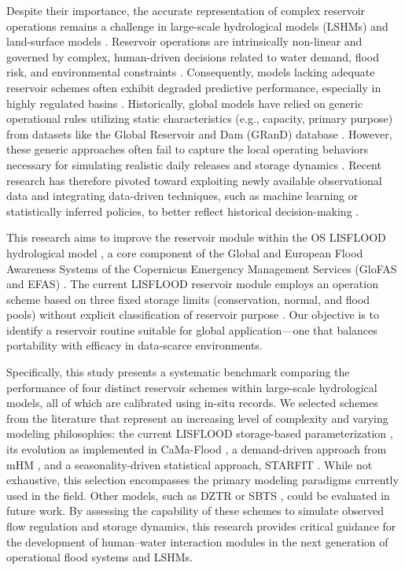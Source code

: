 \documentclass[hess, manuscript]{copernicus}
\begin{document}
Despite their importance, the accurate representation of complex reservoir operations remains a challenge in large-scale hydrological models (LSHMs) and land-surface models \citep{Turner2021, Sadki2023, Salwey2024}. Reservoir operations are intrinsically non-linear and governed by complex, human-driven decisions related to water demand, flood risk, and environmental constraints \citep{Coerver2018, Hanazaki2022, Steyaert2022, Salwey2024, Shrestha2024}. Consequently, models lacking adequate reservoir schemes often exhibit degraded predictive performance, especially in highly regulated basins \citep{Turner2021, Salwey2024, Steyaert2025}. Historically, global models have relied on generic operational rules utilizing static characteristics (e.g., capacity, primary purpose) from datasets like the Global Reservoir and Dam (GRanD) database \citep{Lehner2011}. However, these generic approaches often fail to capture the local operating behaviors necessary for simulating realistic daily releases and storage dynamics \citep{Turner2021}. Recent research has therefore pivoted toward exploiting newly available observational data and integrating data-driven techniques, such as machine learning or statistically inferred policies, to better reflect historical decision-making \citep{Coerver2018, Turner2021, Steyaert2025}.

This research aims to improve the reservoir module within the OS LISFLOOD hydrological model \citep{DeRoo2000, vanderKnijff2010, Burek2013a, JRC2026}, a core component of the Global and European Flood Awareness Systems of the Copernicus Emergency Management Services (GloFAS and EFAS) \citep{EFAS2026, GloFAS2026}. The current LISFLOOD reservoir module employs an operation scheme based on three fixed storage limits (conservation, normal, and flood pools) without explicit classification of reservoir purpose  \citep{Zajac2017}. Our objective is to identify a reservoir routine suitable for global application—one that balances portability with efficacy in data-scarce environments.

Specifically, this study presents a systematic benchmark comparing the performance of four distinct reservoir schemes within large-scale hydrological models, all of which are calibrated using in-situ records. We selected schemes from the literature that represent an increasing level of complexity and varying modeling philosophies: the current LISFLOOD storage-based parameterization \citep{Zajac2017}, its evolution as implemented in CaMa-Flood \citep{Hanazaki2022}, a demand-driven approach from mHM \citep{Shrestha2024}, and a seasonality-driven statistical approach, STARFIT \citep{Turner2021}. While not exhaustive, this selection encompasses the primary modeling paradigms currently used in the field. Other models, such as DZTR \citep{Yassin2019} or SBTS \citep{Shen2025}, could be evaluated in future work. By assessing the capability of these schemes to simulate observed flow regulation and storage dynamics, this research provides critical guidance for the development of human–water interaction modules in the next generation of operational flood systems and LSHMs.
\end{document}
